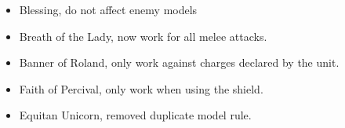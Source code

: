 \subtitle{Army Model Rules}

\begin{itemize}[label={-}]
\item Blessing, do not affect enemy models
\item Breath of the Lady, now work for all melee attacks.
\end{itemize}

%

\subtitle{Special Equipment}

\begin{itemize}[label={-}]
\item Banner of Roland, only work against charges declared by the unit.
\item Faith of Percival, only work when using the shield.
\end{itemize}

\subtitle{Characters}

\begin{itemize}[label={-}]
\item Equitan Unicorn, removed duplicate model rule.
\end{itemize}

%

%

%

%

%

